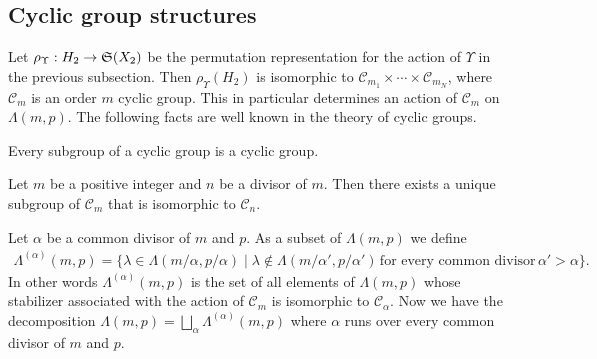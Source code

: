 \subsection{Cyclic group structures}\label{subsec:3_2}

Let $\rho_{\Upsilon}: H_2 \rightarrow {\frak S}(X_2)$ be
the permutation representation for the
action of $\Upsilon$ in the previous subsection.
Then
$\rho_{\Upsilon} (H_2)$ is isomorphic to $\mathcal{C}_{m_1} \times \cdots \times \mathcal{C}_{m_N}$, where
$\mathcal{C}_m$ is an order $m$ cyclic group.
This in particular determines an action of $\mathcal{C}_m$ on $\Lambda (m,p)$.
The following facts are well known in the theory of cyclic groups.
\begin{proposition}
Every subgroup of a cyclic group is a cyclic group.
\end{proposition}
\begin{proposition}
Let $m$ be a positive integer and $n$ be a divisor of $m$.
Then  there exists a unique subgroup of $\mathcal{C}_m$ that is isomorphic to $\mathcal{C}_n$.
\end{proposition}
Let $\alpha$ be a common divisor of $m$ and $p$.
As a subset of $\Lambda (m,p)$ %
we def\/ine
\begin{gather}\label{eq:may12_1}
\Lambda^{(\alpha)} (m,p) = \{
\lambda \in \Lambda (m/\alpha,p/\alpha) \mid
\lambda \notin \Lambda (m/\alpha',p/\alpha') \, \mbox{for every common divisor} \, \alpha' > \alpha  \}.\!\!
\end{gather}
In other words
$\Lambda^{(\alpha)} (m,p)$ is the set of all elements of $\Lambda (m,p)$
whose stabilizer associated with
the action of {$\mathcal{C}_m$}
is isomorphic to $\mathcal{C}_\alpha$.
Now we have the decomposition $\Lambda (m,p) = \bigsqcup_{\alpha} \Lambda^{(\alpha)}(m,p)$
where $\alpha$ runs over every common divisor of $m$ and $p$.

